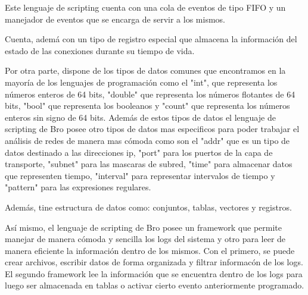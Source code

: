 Este lenguaje de scripting cuenta con una cola de eventos de tipo FIFO y un manejador de eventos que se encarga de servir a los mismos.

Cuenta, adem\'a con un tipo de registro especial que almacena la informaci\'on del estado de las conexiones durante su tiempo de vida.

Por otra parte, dispone de los tipos de datos comunes que encontramos en la mayor\'ia de los lenguajes de programaci\'on como el "int", que representa los n\'umeros enteros de 64 bits, "double" que representa los n\'umeros flotantes de 64 bits, "bool" que representa los booleanos y "count"  que representa los n\'umeros enteros sin signo de 64 bits. Adem\'as de estos tipos de datos el lenguaje de scripting de Bro posee otro tipos de datos  mas especificos para poder trabajar el an\'alisis de redes de manera mas c\'omoda como son el "addr" que es un tipo de datos destinado a las direcciones ip, "port" para los puertos de la capa de transporte, "subnet" para las mascaras de subred, "time" para almacenar datos que representen tiempo, "interval" para representar intervalos de tiempo y "pattern" para las expresiones regulares.

Adem\'as, tine estructura de datos como: conjuntos, tablas, vectores y registros.

As\'i mismo, el lenguaje de scripting de Bro posee un framework que permite manejar de manera c\'omoda y sencilla los logs del sistema y otro para leer de manera eficiente la informaci\'on dentro de los mismos. Con el primero, se puede crear archivos, escribir datos de forma organizada y filtrar informac\'on de los logs. El segundo framework lee la informaci\'on que se encuentra dentro de los logs para luego ser almacenada en tablas o activar cierto evento anteriormente programado.
